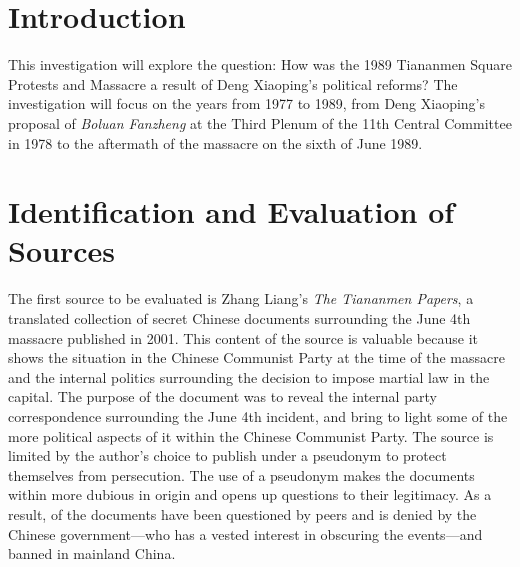 \documentclass{paper}
\begin{document}
\insertTitlePage
\tableofcontents
\thispagestyle{empty}
\newpage
\setcounter{page}{1}
\onehalfspacing

\section{Introduction}
This investigation will explore the question: How was the 1989 Tiananmen Square Protests and Massacre a result of Deng Xiaoping's political reforms?
The investigation will focus on the years from 1977 to 1989, from Deng Xiaoping's proposal of \emph{Boluan Fanzheng} at the Third Plenum of the 11th Central Committee in 1978 to the aftermath of the massacre on the sixth of June 1989.

\section{Identification and Evaluation of Sources}
The first source to be evaluated is Zhang Liang's \textit{The Tiananmen Papers},\autocite{tiananmen} a translated collection of secret Chinese documents surrounding the June 4th massacre published in 2001.
This content of the source is valuable because it shows the situation in the Chinese Communist Party at the time of the massacre and the internal politics surrounding the decision to impose martial law in the capital.
The purpose of the document was to reveal the internal party correspondence surrounding the June 4th incident, and bring to light some of the more political aspects of it within the Chinese Communist Party.
The source is limited by the author's choice to publish under a pseudonym to protect themselves from persecution.
The use of a pseudonym makes the documents within more dubious in origin and opens up questions to their legitimacy.
As a result, of the documents have been questioned by peers and is denied by the Chinese government---who has a vested interest in obscuring the events---and banned in mainland China.
\end{document}
